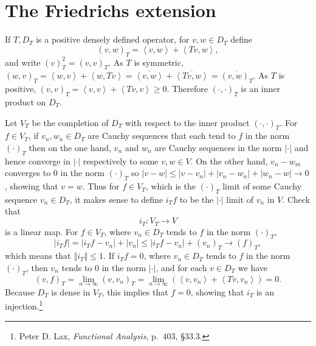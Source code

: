 \documentclass{article}
\newcommand{\inner}[2]{\left\langle #1, #2 \right\rangle}
\newcommand{\norm}[1]{\left\Vert #1 \right\Vert}
\theoremstyle{definition}
\begin{document}
\section{The Friedrichs extension}
If $T,D_T$ is a positive densely defined operator,
for $v,w \in D_T$ define
\[
(v,w)_T = \inner{v}{w}+\inner{Tv}{w},
\]
and write  $(v)_T^2 = (v,v)_T$. 
As $T$ is symmetric, $(w,v)_T = \inner{w}{v}+\inner{w}{Tv}
=\overline{\inner{v}{w}}+\overline{\inner{Tv}{w}}=\overline{(v,w)_T}$.
As $T$ is positive, $(v,v)_T = \inner{v}{v}+\inner{Tv}{v} \geq 0$. 
Therefore $(\cdot,\cdot)_T$ is an inner product on $D_T$. 

Let $V_T$ be the completion of $D_T$ with respect to the inner product $(\cdot,\cdot)_T$. 
For $f \in V_T$, if $v_n,w_n \in D_T$ are Cauchy sequences that each tend to $f$ in the norm
$(\cdot)_T$ then on the one hand,
$v_n$ and $w_n$ are Cauchy sequences in the norm
$|\cdot|$ and hence converge in $|\cdot|$ respectively to some $v,w \in V$.
On the other hand, $v_n-w_m$ converges to $0$ in the norm $(\cdot)_T$ so
$|v-w| \leq |v-v_n| + |v_n-w_n| + |w_n-w| \to 0$, showing that $v=w$. Thus for $f \in V_T$, which is the $(\cdot)_T$ limit
of some Cauchy sequence $v_n \in D_T$, it makes sense to
define $i_T f$ to be the $|\cdot|$ limit of $v_n$ in $V$. Check that
\[
i_T:V_T \to V
\]
 is a linear map. 
For $f \in V_T$, where $v_n \in D_T$ tends to $f$ in the norm $(\cdot)_T$, 
\[
|i_T f| = |i_T f - v_n| + |v_n| \leq |i_T f -v_n| + (v_n)_T \to  (f)_T, 
\]
which means that $\norm{i_T} \leq 1$.
 If $i_T f = 0$, where $v_n \in D_T$ tends to $f$ in the norm $(\cdot)_T$,
 then $v_n$ tends to $0$ in the norm $|\cdot|$, and  for each $v \in D_T$ we have
 \[
 (v,f)_T = \lim_{n \to \infty} (v,v_n)_T= \lim_{n \to \infty} (\inner{v}{v_n}+\inner{Tv}{v_n})
 =0.
 \]
 Because $D_T$ is dense in $V_T$, this implies that $f=0$, showing that $i_T$ is an injection.\footnote{Peter D.
 Lax, {\em Functional Analysis}, p.~403, \S 33.3.}
 
\end{document}
